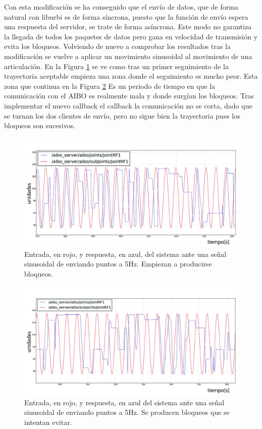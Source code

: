 \documentclass[12pt,a4paper,final,twoside]{book}
\begin{document}
Con esta modificación se ha conseguido que el envío de datos, que de forma natural con liburbi es de forma síncrona, puesto que la función de envío espera una respuesta del servidor, se trate de forma asíncrona. Este modo no garantiza la llegada de todos los paquetes de datos pero gana en velocidad de transmisión y evita los bloqueos.
Volviendo de nuevo a comprobar los resultados tras la modificación se vuelve a aplicar un movimiento sinusoidal al movimiento de una articulación.
En la Figura \ref{fig:ASempiezamala} se ve como tras un primer seguimiento de la trayectoria aceptable empieza una zona donde el seguimiento es mucho peor. Esta zona que continua en la Figura \ref{fig:ASpeor} Es un periodo de tiempo en que la comunicación con el AIBO es realmente mala y donde surgían los bloqueos. Tras implementar el nuevo callback el callback la comunicación no se corta, dado que se turnan los dos clientes de envío, pero no sigue bien la trayectoria pues los bloqueos son sucesivos.

\begin{figure}[H]
	\centering
    \includegraphics[scale=0.2]{images/empiezamala.jpg}
 	\caption{Entrada, en rojo, y respuesta, en azul, del sistema ante una señal sinusoidal de enviando puntos a 5Hz. Empiezan a producirse bloqueos.}
  \label{fig:ASempiezamala}
\end{figure}
\begin{figure}[H]
	\centering
    \includegraphics[scale=0.2]{images/peora5hz.jpg}
 	\caption{Entrada, en rojo, y respuesta, en azul del sistema ante una señal sinusoidal de enviando puntos a 5Hz. Se producen bloqueos que se intentan evitar.}
  \label{fig:ASpeor}
\end{figure}
\end{document}
